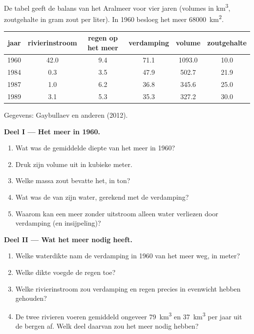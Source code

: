 \begin{problem}
\label{pb:g10:freshwater-resources:1}
De tabel geeft de balans van het Aralmeer voor vier jaren (volumes in
\unit{km^3}, zoutgehalte in gram zout per liter). In 1960 besloeg het meer
\qty{68000}{km^2}.
\begin{center}
\small
\begin{tabular}{|c|c|c|c|c|c|}
\hline
jaar & rivierinstroom & regen op het meer & verdamping & volume & zoutgehalte \\ \hline
1960 & 42.0 & 9.4 & 71.1 & 1093.0 & 10.0 \\ \hline
1984 & 0.3 & 3.5 & 47.9 & 502.7 & 21.9 \\ \hline
1987 & 1.0 & 6.2 & 36.8 & 345.6 & 25.0 \\ \hline
1989 & 3.1 & 5.3 & 35.3 & 327.2 & 30.0 \\ \hline
\end{tabular}

{\small Gegevens: Gaybullaev en anderen (2012).}
\end{center}

\medskip
\noindent\textbf{Deel I --- Het meer in 1960.}
\begin{enumerate}
  \item Wat was de gemiddelde diepte van het meer in 1960?
  \item Druk zijn volume uit in kubieke meter.
  \item Welke massa zout bevatte het, in ton?
  \item Wat was de  van zijn water, gerekend met de verdamping?
  \item Waarom kan een meer zonder uitstroom alleen water verliezen door
        verdamping (en insijpeling)?
\end{enumerate}

\medskip
\noindent\textbf{Deel II --- Wat het meer nodig heeft.}
\begin{enumerate}[resume]
  \item Welke waterdikte nam de verdamping in 1960 van het meer weg, in
        meter?
  \item Welke dikte voegde de regen toe?
  \item Welke rivierinstroom zou verdamping en regen precies in evenwicht hebben
        gehouden?
  \item De twee rivieren voeren gemiddeld ongeveer \qty{79}{km^3} en
        \qty{37}{km^3} per jaar uit de bergen af. Welk deel daarvan zou het
        meer nodig hebben?
\end{enumerate}


\end{problem}
